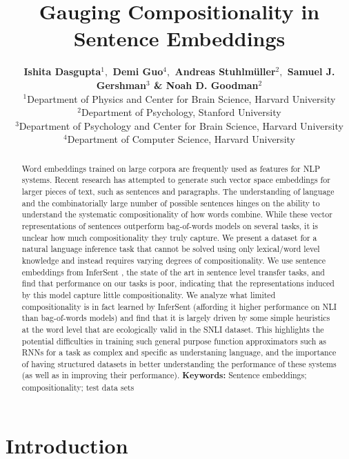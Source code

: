 \documentclass[10pt,letterpaper]{article}
\title{Gauging Compositionality in Sentence Embeddings}
\author{\textbf{Ishita Dasgupta$^1,$  Demi Guo$^4,$ Andreas Stuhlm\"uller$^2,$ Samuel J. Gershman$^3$ \& Noah D. Goodman$^2$}\medskip\\ 
$^1$Department of Physics and Center for Brain Science, Harvard University\\
$^2$Department of Psychology, Stanford University\\
$^3$Department of Psychology and Center for Brain Science, Harvard University\\
$^4$Department of Computer Science, Harvard University
}
\begin{document}
\maketitle


\begin{abstract}
Word embeddings trained on large corpora are frequently used as features for NLP systems. Recent research has attempted to generate such vector space embeddings for larger pieces of text, such as sentences and paragraphs. The understanding of language and the combinatorially large number of possible sentences hinges on the ability to understand the systematic compositionality of how words combine. While these vector representations of sentences outperform bag-of-words models on several tasks, it is unclear how much compositionality they truly capture. We present a dataset for a natural language inference task that cannot be solved using only lexical/word level knowledge and instead requires varying degrees of compositionality. We use sentence embeddings from InferSent \citep{Conneau:2017uf}, the state of the art in sentence level transfer tasks, and find that performance on our tasks is poor, indicating that the representations induced by this model capture little compositionality. We analyze what limited compositionality is in fact learned by InferSent (affording it higher performance on NLI than bag-of-words models) and find that it is largely driven by some simple heuristics at the word level that are ecologically valid in the SNLI dataset. This highlights the potential difficulties in training such general purpose function approximators such as RNNs for a task as complex and specific as understaning language, and the importance of having structured datasets in better understanding the performance of these systems (as well as in improving their performance).
\textbf{Keywords:} 
Sentence embeddings; compositionality; test data sets
\end{abstract}


\section{Introduction}
\end{document}
